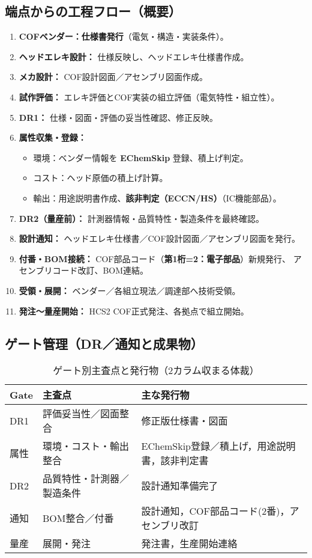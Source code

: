 \documentclass[10pt,conference]{IEEEtran}
\begin{document}
\subsection{端点からの工程フロー（概要）}
\begin{enumerate}
  \item \textbf{COFベンダー：仕様書発行}（電気・構造・実装条件）。
  \item \textbf{ヘッドエレキ設計：} 仕様反映し、ヘッドエレキ仕様書作成。
  \item \textbf{メカ設計：} COF設計図面／アセンブリ図面作成。
  \item \textbf{試作評価：} エレキ評価とCOF実装の組立評価（電気特性・組立性）。
  \item \textbf{DR1：} 仕様・図面・評価の妥当性確認、修正反映。
  \item \textbf{属性収集・登録：}
    \begin{itemize}
      \item 環境：ベンダー情報を \textbf{EChemSkip} 登録、積上げ判定。
      \item コスト：ヘッド原価の積上げ計算。
      \item 輸出：用途説明書作成、\textbf{該非判定（ECCN/HS）}（IC機能部品）。
    \end{itemize}
  \item \textbf{DR2（量産前）：} 計測器情報・品質特性・製造条件を最終確認。
  \item \textbf{設計通知：} ヘッドエレキ仕様書／COF設計図面／アセンブリ図面を発行。
  \item \textbf{付番・BOM接続：} COF部品コード（\textbf{第1桁=2：電子部品}）新規発行、
        アセンブリコード改訂、BOM連結。
  \item \textbf{受領・展開：} ベンダー／各組立現法／調達部へ技術受領。
  \item \textbf{発注～量産開始：} HCS2 COF正式発注、各拠点で組立開始。
\end{enumerate}

\subsection{ゲート管理（DR／通知と成果物）}
\begin{table}[t]
\centering
\caption{ゲート別主査点と発行物（2カラム収まる体裁）}
\label{tab:hcs2_gates}
\footnotesize
\begin{tabular}{@{}p{8mm}p{28mm}p{36mm}@{}}
\toprule
\textbf{Gate} & \textbf{主査点} & \textbf{主な発行物} \\
\midrule
DR1 & 評価妥当性／図面整合 & 修正版仕様書・図面 \\
属性 & 環境・コスト・輸出整合 & EChemSkip登録／積上げ，用途説明書，該非判定書 \\
DR2 & 品質特性・計測器／製造条件 & 設計通知準備完了 \\
通知 & BOM整合／付番 & 設計通知，COF部品コード(2番)，アセンブリ改訂 \\
量産 & 展開・発注 & 発注書，生産開始連絡 \\
\bottomrule
\end{tabular}
\end{table}
\end{document}
